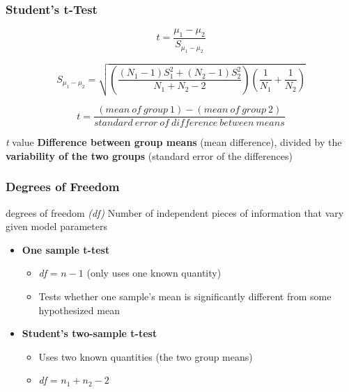 \documentclass[12pt, block=fill]{beamer}
\begin{document}
\begin{frame}
  \frametitle{Student's t-Test}

  $$t = \frac{\mu_{1}-\mu_{2}}{S_{\mu_{1}-\mu_{2}}} $$

  $$
    S_{\mu_{1}-\mu_{2}} = \sqrt{ \left(\frac{ (N_{1}-1)S_{1}^{2} + (N_{2}-1)S_{2}^{2} }{ N_{1}+N_{2}-2 }\right)
                    \left(\frac{1}{ N_{1} } + \frac{1}{ N_{2} }\right)
                  }
  $$

  $$
    t = \frac{(mean\ of\ group\ 1) - (mean\ of\ group\ 2)}{standard\ error\ of\ difference\ between\ means}
  $$
  
  
  \begin{exampleblock}{\textit{t} value}
    \textbf{Difference between group means} (mean difference), divided by the \textbf{variability of the two groups} (standard error of the differences)
  \end{exampleblock}

\end{frame}


\begin{frame}
  \frametitle{Degrees of Freedom}
  
  \begin{exampleblock}{degrees of freedom \textit{(df)}}
    Number of independent pieces of information that vary given model parameters
  \end{exampleblock}
  
  \begin{itemize}
      \item \textbf{One sample t-test}
    \begin{itemize}
      \item \textit{df} = $n - 1$ (only uses one known quantity)
      \item Tests whether one sample's mean is significantly different from some hypothesized mean
    \end{itemize}
    \item \textbf{Student's two-sample t-test}
    \begin{itemize}
      \item Uses two known quantities (the two group means)
      \item \textit{df} = $n_{1} + n_{2} -2$
    \end{itemize}

  \end{itemize}

\end{frame}
\end{document}
